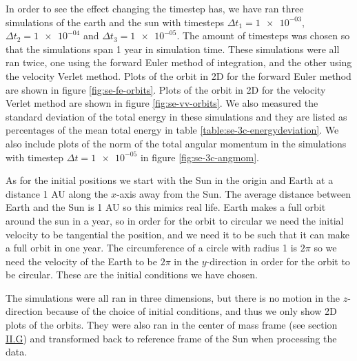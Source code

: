 \documentclass[reprint,english,notitlepage]{revtex4-1}  %
\begin{document}
In order to see the effect changing the timestep has, we have ran three simulations of the earth and the sun with timesteps $\Delta t_1 = \num{1e-03}$, $\Delta t_2 = \num{1e-04}$ and $\Delta t_3 = \num{1e-05}$. The amount of timesteps was chosen so that the simulations span 1 year in simulation time. These simulations were all ran twice, one using the forward Euler method of integration, and the other using the velocity Verlet method. Plots of the orbit in 2D for the forward Euler method are shown in figure \ref{fig:se-fe-orbits}. Plots of the orbit in 2D for the velocity Verlet method are shown in figure \ref{fig:se-vv-orbits}. We also measured the standard deviation of the total energy in these simulations and they are listed as percentages of the mean total energy in table \ref{table:se-3c-energydeviation}. We also include plots of the norm of the total angular momentum in the simulations with timestep $\Delta t = \num{1e-05}$ in figure \ref{fig:se-3c-angmom}.

As for the initial positions we start with the Sun in the origin and Earth at a distance 1 AU along the $x$-axis away from the Sun. The average distance between Earth and the Sun is 1 AU so this mimics real life. Earth makes a full orbit around the sun in a year, so in order for the orbit to circular we need the initial velocity to be tangential the position, and we need it to be such that it can make a full orbit in one year. The circumference of a circle with radius 1 is $2\pi$ so we need the velocity of the Earth to be $2\pi$ in the $y$-direction in order for the orbit to be circular. These are the initial conditions we have chosen. 

The simulations were all ran in three dimensions, but there is no motion in the $z$-direction because of the choice of initial conditions, and thus we only show 2D plots of the orbits. They were also ran in the center of mass frame (see section \hyperref[sec:II:g]{II.G}) and transformed back to reference frame of the Sun when processing the data.
\end{document}
